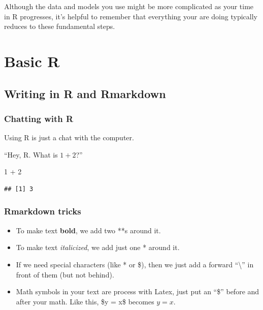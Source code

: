 \documentclass[
]{book}
\newenvironment{Shaded}{\begin{snugshade}}{\end{snugshade}}
\newcommand{\DecValTok}[1]{\textcolor[rgb]{0.00,0.00,0.81}{#1}}
\newcommand{\SpecialCharTok}[1]{\textcolor[rgb]{0.00,0.00,0.00}{#1}}
\providecommand{\tightlist}{%
  \setlength{\itemsep}{0pt}\setlength{\parskip}{0pt}}
\begin{document}
Although the data and models you use might be more complicated as your time in R progresses, it's helpful to remember that everything your are doing typically reduces to these fundamental steps.

\hypertarget{basic-r}{%
\chapter{Basic R}\label{basic-r}}

\hypertarget{writing-in-r-and-rmarkdown}{%
\section{Writing in R and Rmarkdown}\label{writing-in-r-and-rmarkdown}}

\hypertarget{chatting-with-r}{%
\subsection{Chatting with R}\label{chatting-with-r}}

Using R is just a chat with the computer.

``Hey, R. What is \(1 + 2\)?''

\begin{Shaded}
\begin{Highlighting}[]
\DecValTok{1} \SpecialCharTok{+} \DecValTok{2}
\end{Highlighting}
\end{Shaded}

\begin{verbatim}
## [1] 3
\end{verbatim}

\hypertarget{rmarkdown-tricks}{%
\subsection{Rmarkdown tricks}\label{rmarkdown-tricks}}

\begin{itemize}
\tightlist
\item
  To make text \textbf{bold}, we add two **s around it.
\item
  To make text \emph{italicized}, we add just one * around it.
\item
  If we need special characters (like * or \$), then we just add a forward ``\textbackslash{}'' in front of them (but not behind).
\item
  Math symbols in your text are process with Latex, just put an ``\$'' before and after your math. Like this, \$y = x\$ becomes \(y = x\).
\end{itemize}
\end{document}
